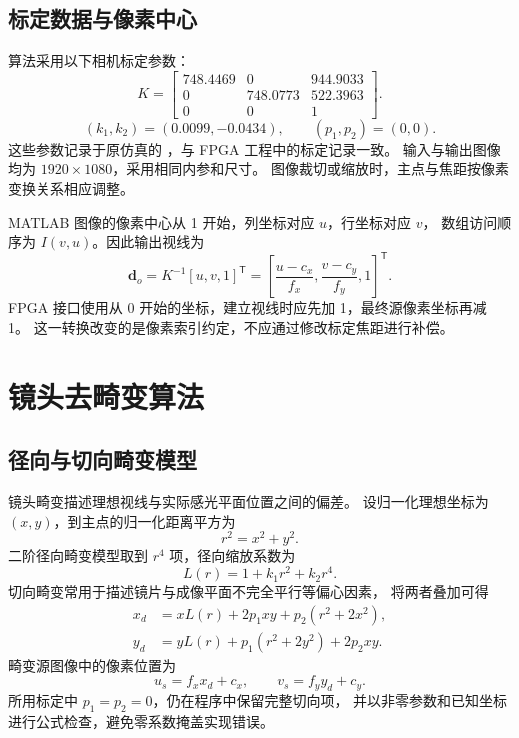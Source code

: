 \subsection{标定数据与像素中心}
算法采用以下相机标定参数：
\begin{equation}
K=\begin{bmatrix}
748.4469&0&944.9033\\
0&748.0773&522.3963\\
0&0&1
\end{bmatrix}.
\end{equation}
\begin{equation}
(k_1,k_2)=(0.0099,-0.0434),\qquad(p_1,p_2)=(0,0).
\end{equation}
这些参数记录于原仿真的 ，与 FPGA 工程中的标定记录一致。
输入与输出图像均为 $1920\times1080$，采用相同内参和尺寸。
图像裁切或缩放时，主点与焦距按像素变换关系相应调整。

MATLAB 图像的像素中心从 1 开始，列坐标对应 $u$，行坐标对应 $v$，
数组访问顺序为 $I(v,u)$。因此输出视线为
\begin{equation}
\boldsymbol d_o=K^{-1}[u,v,1]^{\mathsf T}
=\left[\frac{u-c_x}{f_x},\frac{v-c_y}{f_y},1\right]^{\mathsf T}.
\end{equation}
FPGA 接口使用从 0 开始的坐标，建立视线时应先加 1，最终源像素坐标再减 1。
这一转换改变的是像素索引约定，不应通过修改标定焦距进行补偿。

\section{镜头去畸变算法}
\subsection{径向与切向畸变模型}
镜头畸变描述理想视线与实际感光平面位置之间的偏差。
设归一化理想坐标为 $(x,y)$，到主点的归一化距离平方为
\begin{equation}
r^2=x^2+y^2.
\end{equation}
二阶径向畸变模型取到 $r^4$ 项，径向缩放系数为
\begin{equation}
L(r)=1+k_1r^2+k_2r^4.
\end{equation}
切向畸变常用于描述镜片与成像平面不完全平行等偏心因素，
将两者叠加可得
\begin{align}
x_d&=xL(r)+2p_1xy+p_2(r^2+2x^2),\label{eq:distort-x}\\
y_d&=yL(r)+p_1(r^2+2y^2)+2p_2xy.\label{eq:distort-y}
\end{align}
畸变源图像中的像素位置为
\begin{equation}
u_s=f_xx_d+c_x,\qquad v_s=f_yy_d+c_y.
\label{eq:distort-pixel}
\end{equation}
所用标定中 $p_1=p_2=0$，仍在程序中保留完整切向项，
并以非零参数和已知坐标进行公式检查，避免零系数掩盖实现错误。

